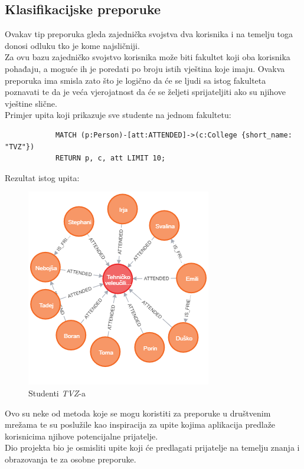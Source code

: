 \documentclass[titlepage, 12pt]{scrartcl}
\begin{document}
	\subsection*{Klasifikacijske preporuke}
	Ovakav tip preporuka gleda zajednička svojstva dva korisnika i na temelju toga donosi odluku tko je kome najsličniji. \\
	Za ovu bazu zajedničko svojstvo korisnika može biti fakultet koji oba korisnika pohađaju, a moguće ih je poredati po broju istih vještina koje imaju. Ovakva preporuka ima smisla zato što je logično da će se ljudi sa istog fakulteta poznavati te da je veća vjerojatnost da će se željeti sprijateljiti ako su njihove vještine slične. \\
	\newpage
	Primjer upita koji prikazuje sve studente na jednom fakultetu:
	
	\begin{samepage}
		\begin{verbatim}
			MATCH (p:Person)-[att:ATTENDED]->(c:College {short_name: "TVZ"})
			RETURN p, c, att LIMIT 10;
		\end{verbatim}
	\end{samepage}
	
	Rezultat istog upita:
	\begin{figure}[h]
		\centering
		\includegraphics[scale=0.7]{slike/same_college.png}
		\caption{Studenti \emph{TVZ}-a}
		\label{fig:common_friends}
	\end{figure}
	
	Ovo su neke od metoda koje se mogu koristiti za preporuke u društvenim mrežama te su poslužile kao inspiracija za upite kojima aplikacija predlaže korisnicima njihove potencijalne prijatelje. \\
	Dio projekta bio je osmisliti upite koji će predlagati prijatelje na temelju znanja i obrazovanja te za osobne preporuke.
	
\end{document}
